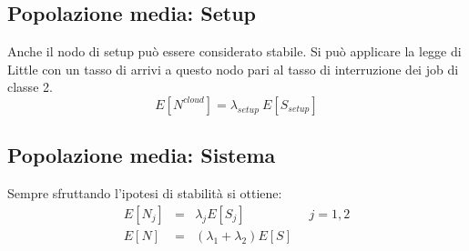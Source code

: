 \subsection{Popolazione media: Setup}
Anche il nodo di setup può essere considerato stabile.
Si può applicare la legge di Little con un tasso di arrivi a questo nodo pari al
tasso di interruzione dei job di classe 2.
\begin{equation}
E[N^{cloud}] = \lambda_{setup} \ E[S_{setup}] 
\end{equation}
%
\subsection{Popolazione media: Sistema}
Sempre sfruttando l'ipotesi di stabilità si ottiene:
\begin{eqnarray}
E[N_j] &=& \lambda_j E[S_j]  \qquad\quad\qquad j=1,2 \\
E[N] &=& (\lambda_1 + \lambda_2) E[S]
\end{eqnarray}
%
